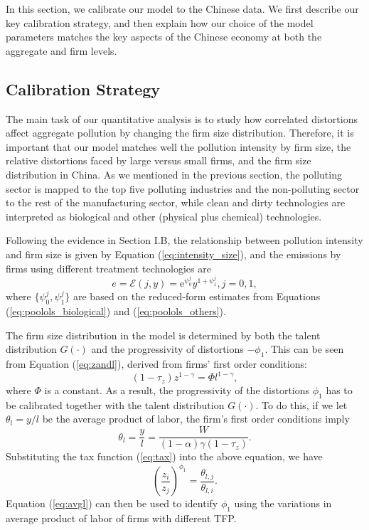 \documentclass[AEJ]{AEA}
\begin{document}
In this section, we calibrate our model to the Chinese data. We first describe our key calibration strategy, and then explain how our choice of the model parameters matches the key aspects of the Chinese economy at both the aggregate and firm levels.

\subsection{Calibration Strategy}

The main task of our quantitative analysis is to study how correlated distortions affect aggregate pollution by changing the firm size distribution. Therefore, it is important that our model matches well the pollution intensity by firm size, the relative distortions faced by large versus small firms, and the firm size distribution in China. As we mentioned in the previous section, the polluting sector is mapped to the top five polluting industries and the non-polluting sector to the rest of the manufacturing sector, while clean and dirty technologies are interpreted as biological and other (physical plus chemical) technologies.

Following the evidence in Section I.B, the relationship between pollution intensity and firm size is given by Equation (\ref{eq:intensity_size}), and the emissions by firms using different treatment technologies are
\begin{equation*}
    e = \mathcal{E}(j,y) = \mathrm{e}^{\psi_0^{j}} y^{1+\psi_1^{j}}, j=0,1,
\end{equation*}
where $\{\psi_0^{j}, \psi_1^{j}\}$ are based on the reduced-form estimates from Equations (\ref{eq:poolols_biological}) and (\ref{eq:poolols_others}).

The firm size distribution in the model is determined by {both} the talent distribution $G(\cdot)$ and the progressivity of distortions $-\phi_1$. This can be seen from Equation (\ref{eq:zandl}), derived from firms' first order conditions:
\begin{equation}
\label{eq:zandl}
    (1-\tau_z)z^{1-\gamma} = \Phi l^{1-\gamma},
\end{equation}
where $\Phi$ is a constant. As a result, the progressivity of the distortions $\phi_1$ has to be calibrated together with the talent distribution $G(\cdot)$. To do this, if we let $\theta_l = y/l$ be the average product of labor, the firm's first order conditions imply
\begin{equation*}
    \theta_l = \frac{y}{l} = \frac{W}{(1-\alpha)\gamma(1-\tau_z)}.
\end{equation*}
Substituting the tax function (\ref{eq:tax}) into the above equation, we have
\begin{equation}
\label{eq:avgl}
    \left(\frac{z_i}{z_j} \right)^{\phi_1} = \frac{\theta_{l,j}}{\theta_{l,i}}.
\end{equation}
Equation (\ref{eq:avgl}) can then be used to identify $\phi_1$ using the variations in average product of labor of firms with different TFP.
\end{document}
